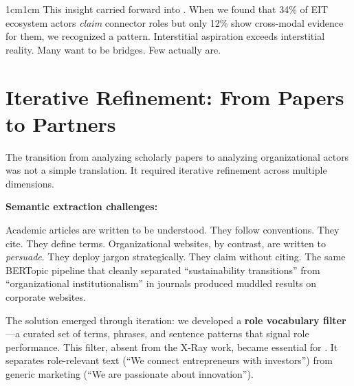 \documentclass[../main.tex]{subfiles}
\begin{document}
\begin{adjustwidth}{1cm}{1cm}
This insight carried forward into \RoleBox. When we found that 34\% of EIT ecosystem actors \textit{claim} connector roles but only 12\% show cross-modal evidence for them, we recognized a pattern. Interstitial aspiration exceeds interstitial reality. Many want to be bridges. Few actually are.

\vspace{0.8cm}

\section*{Iterative Refinement: From Papers to Partners}

The transition from analyzing scholarly papers to analyzing organizational actors was not a simple translation. It required iterative refinement across multiple dimensions.


\noindent\textbf{Semantic extraction challenges:}

Academic articles are written to be understood. They follow conventions. They cite. They define terms. Organizational websites, by contrast, are written to \textit{persuade}. They deploy jargon strategically. They claim without citing. The same BERTopic pipeline that cleanly separated ``sustainability transitions'' from ``organizational institutionalism'' in journals produced muddled results on corporate websites.

The solution emerged through iteration: we developed a \textbf{role vocabulary filter}---a curated set of terms, phrases, and sentence patterns that signal role performance. This filter, absent from the X-Ray work, became essential for \RoleBox. It separates role-relevant text (``We connect entrepreneurs with investors'') from generic marketing (``We are passionate about innovation'').

\begin{center}
\end{center}
\end{adjustwidth}
\end{document}
